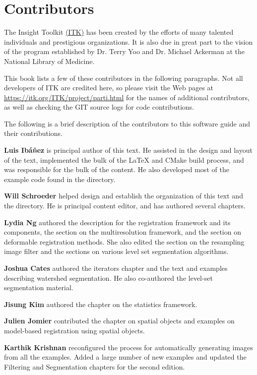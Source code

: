 \chapter*{Contributors}
\noindent

The Insight Toolkit \href{https://itk.org}{(ITK)} has been created by the
efforts of many talented individuals and prestigious organizations. It is also
due in great part to the vision of the program established by Dr. Terry Yoo
and Dr. Michael Ackerman at the National Library of Medicine.

This book lists a few of these contributors in the following paragraphs. Not
all developers of ITK are credited here, so please visit the Web pages at
\href{https://itk.org/ITK/project/parti.html}{https://itk.org/ITK/project/parti.html}
for the names of additional contributors, as well as checking the GIT source
logs for code contributions.

The following is a brief description of the contributors to this software
guide and their contributions.


{\bf Luis Ib\'{a}\~{n}ez} is principal author of this text.
He assisted in the design and layout of the text, implemented the bulk of
the \LaTeX{} and CMake build process, and was responsible for the bulk of
the content. He also developed most of the example code found in the
 directory.

{\bf Will Schroeder} helped design and establish the organization
of this text and the  directory. He is principal
content editor, and has authored several chapters.

{\bf Lydia Ng} authored the description for the registration framework
and its components, the section on the multiresolution framework, and
the section on deformable registration methods. She also edited the
section on the resampling image filter and the sections on various
level set segmentation algorithms.

{\bf Joshua Cates} authored the iterators chapter and the text and examples
describing watershed segmentation. He also co-authored the level-set
segmentation material.

{\bf Jisung Kim} authored the chapter on the statistics framework.

{\bf Julien Jomier} contributed the chapter on spatial objects and examples on
model-based registration using spatial objects.

{\bf Karthik Krishnan} reconfigured the process for automatically generating
images from all the examples. Added a large number of new examples and updated
the Filtering and Segmentation chapters for the second edition.

